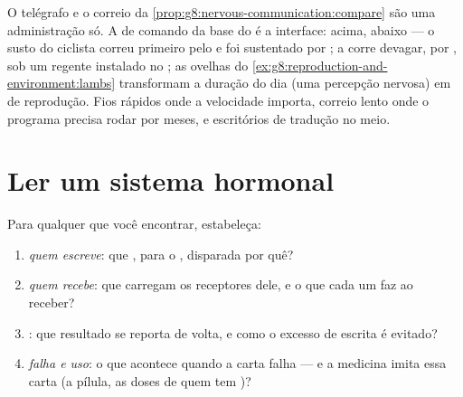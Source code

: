 \begin{remark}\label{rem:g8:hormonal-communication:partnership}
O telégrafo e o correio da
\cref{prop:g8:nervous-communication:compare} são uma administração só.
A  de comando da base do  é a interface:  acima,  abaixo --- o susto do ciclista correu primeiro
pelo  e foi sustentado por ; a  corre devagar,
por , sob um regente instalado no ; as ovelhas do
\cref{ex:g8:reproduction-and-environment:lambs} transformam a duração
do dia (uma percepção nervosa) em  de reprodução. Fios
rápidos onde a velocidade importa, correio lento onde o programa
precisa rodar por meses, e escritórios de tradução no meio.
\end{remark}

\section{Ler um sistema hormonal}

\begin{method}\label{met:g8:hormonal-communication:read}
Para qualquer  que você encontrar, estabeleça:
\begin{enumerate}
  \item \emph{quem escreve}: que , para o , disparada
        por quê?
  \item \emph{quem recebe}: que  carregam os receptores
        dele, e o que cada um faz ao receber?
  \item \emph{}: que resultado se reporta de volta, e
        como o excesso de escrita é evitado?
  \item \emph{falha e uso}: o que acontece quando a carta falha --- e a
        medicina imita essa carta (a pílula, as doses de quem tem
        )?
\end{enumerate}
\end{method}

